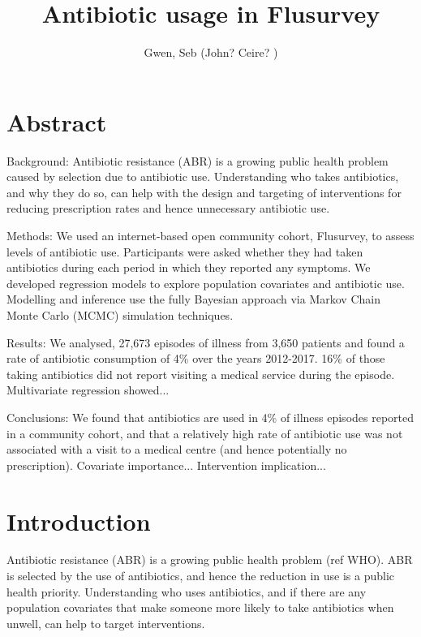 \documentclass{article}
\title{Antibiotic usage in Flusurvey}
\author{Gwen, Seb (John? Ceire? )}
\date{}
\begin{document}
	 
	\maketitle{}

	\tableofcontents{}

	\clearpage


	\section{Abstract}

	Background: Antibiotic resistance (ABR) is a growing public health problem caused by selection due to antibiotic use. Understanding who takes antibiotics, and why they do so, can help with the design and targeting of interventions for reducing prescription rates and hence unnecessary antibiotic use. 
	
	Methods: We used an internet-based open community cohort, Flusurvey, to assess levels of antibiotic use. Participants were asked whether they had taken antibiotics during each period in which they reported any symptoms. We developed regression models to explore population covariates and antibiotic use. Modelling and inference use the fully Bayesian approach via Markov Chain Monte Carlo (MCMC) simulation techniques.

	Results: We analysed, 27,673 episodes of illness from 3,650 patients and found a rate of antibiotic consumption of 4\% over the years 2012-2017. 16\% of those taking antibiotics did not report visiting a medical service during the episode.  
	Multivariate regression showed... 

	Conclusions: We found that antibiotics are used in 4\% of illness episodes reported in a community cohort, and that a relatively high rate of antibiotic use was not associated with a visit to a medical centre (and hence potentially no prescription).
	Covariate importance... 
	Intervention implication...


\clearpage

	\section{Introduction}

Antibiotic resistance (ABR) is a growing public health problem (ref WHO). ABR is selected by the use of antibiotics, and hence the reduction in use is a public health priority. Understanding who uses antibiotics, and if there are any population covariates that make someone more likely to take antibiotics when unwell, can help to target interventions.
\end{document}
